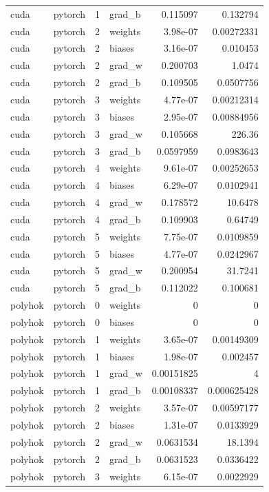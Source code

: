 \begin{tabular}{llrlrr}
cuda & pytorch & 1 & grad\_b & 0.115097 & 0.132794 \\
cuda & pytorch & 2 & weights & 3.98e-07 & 0.00272331 \\
cuda & pytorch & 2 & biases & 3.16e-07 & 0.010453 \\
cuda & pytorch & 2 & grad\_w & 0.200703 & 1.0474 \\
cuda & pytorch & 2 & grad\_b & 0.109505 & 0.0507756 \\
cuda & pytorch & 3 & weights & 4.77e-07 & 0.00212314 \\
cuda & pytorch & 3 & biases & 2.95e-07 & 0.00884956 \\
cuda & pytorch & 3 & grad\_w & 0.105668 & 226.36 \\
cuda & pytorch & 3 & grad\_b & 0.0597959 & 0.0983643 \\
cuda & pytorch & 4 & weights & 9.61e-07 & 0.00252653 \\
cuda & pytorch & 4 & biases & 6.29e-07 & 0.0102941 \\
cuda & pytorch & 4 & grad\_w & 0.178572 & 10.6478 \\
cuda & pytorch & 4 & grad\_b & 0.109903 & 0.64749 \\
cuda & pytorch & 5 & weights & 7.75e-07 & 0.0109859 \\
cuda & pytorch & 5 & biases & 4.77e-07 & 0.0242967 \\
cuda & pytorch & 5 & grad\_w & 0.200954 & 31.7241 \\
cuda & pytorch & 5 & grad\_b & 0.112022 & 0.100681 \\
polyhok & pytorch & 0 & weights & 0 & 0 \\
polyhok & pytorch & 0 & biases & 0 & 0 \\
polyhok & pytorch & 1 & weights & 3.65e-07 & 0.00149309 \\
polyhok & pytorch & 1 & biases & 1.98e-07 & 0.002457 \\
polyhok & pytorch & 1 & grad\_w & 0.00151825 & 4 \\
polyhok & pytorch & 1 & grad\_b & 0.00108337 & 0.000625428 \\
polyhok & pytorch & 2 & weights & 3.57e-07 & 0.00597177 \\
polyhok & pytorch & 2 & biases & 1.31e-07 & 0.0133929 \\
polyhok & pytorch & 2 & grad\_w & 0.0631534 & 18.1394 \\
polyhok & pytorch & 2 & grad\_b & 0.0631523 & 0.0336422 \\
polyhok & pytorch & 3 & weights & 6.15e-07 & 0.0022929 \\

\end{tabular}
